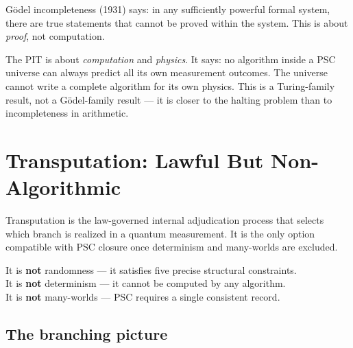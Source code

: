 \documentclass[11pt,a4paper]{article}
\begin{document}
G\"{o}del incompleteness (1931) says: in any sufficiently powerful formal system, there
are true statements that cannot be proved within the system.  This is about
\emph{proof}, not computation.

The PIT is about \emph{computation} and \emph{physics}.  It says: no algorithm
inside a PSC universe can always predict all its own measurement outcomes.  The
universe cannot write a complete algorithm for its own physics.  This is a Turing-family
result, not a G\"{o}del-family result --- it is closer to the halting problem than to
incompleteness in arithmetic.

\section{Transputation: Lawful But Non-Algorithmic}

\begin{tcolorbox}[colback=boxgreen,colframe=green!50!black,title=Definition: Transputation]
  Transputation is the law-governed internal adjudication process that selects
  which branch is realized in a quantum measurement.  It is the only option
  compatible with PSC closure once determinism and many-worlds are excluded.

  It is \textbf{not} randomness --- it satisfies five precise structural constraints.\\
  It is \textbf{not} determinism --- it cannot be computed by any algorithm.\\
  It is \textbf{not} many-worlds --- PSC requires a single consistent record.
\end{tcolorbox}

\subsection{The branching picture}
\end{document}
